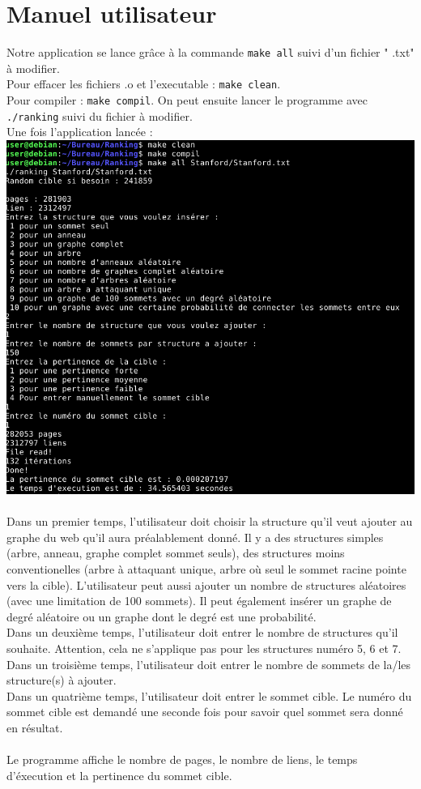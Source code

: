 \documentclass[a4paper,11pt]{article}
\begin{document}
\section{Manuel utilisateur}
	Notre application se lance grâce à la commande \texttt{make all} suivi d'un fichier " .txt" à modifier.\\
	Pour effacer les fichiers .o et l'executable : \texttt{make clean}.\\
	Pour compiler : \texttt{make compil}. On peut ensuite lancer le programme avec \texttt{./ranking} suivi du fichier à modifier.\\
	Une fois l'application lancée :\\
	\includegraphics[scale = 0.5]{Captures/manuel.png}\\
	\\
	Dans un premier temps, l'utilisateur doit choisir la structure qu'il veut ajouter au graphe du web qu'il aura préalablement donné.
	Il y a des structures simples (arbre, anneau, graphe complet sommet seuls), des structures moins conventionelles (arbre à attaquant unique, arbre où seul le sommet racine pointe vers la cible). L'utilisateur peut aussi ajouter un nombre de structures aléatoires (avec une limitation de 100 sommets). Il peut également insérer un graphe de degré aléatoire ou un graphe dont le degré est une probabilité.\\
	Dans un deuxième temps,  l'utilisateur doit entrer le nombre de structures qu'il souhaite. Attention, cela ne s'applique pas pour les structures numéro 5, 6 et 7.\\
	Dans un troisième temps, l'utilisateur doit entrer le nombre de sommets de la/les structure(s) à ajouter.\\
	Dans un quatrième temps, l'utilisateur doit entrer le sommet cible. Le numéro du sommet cible est demandé une seconde fois pour savoir quel sommet sera donné en résultat.\\
	\\
	Le programme affiche le nombre de pages, le nombre de liens, le temps d'éxecution et la pertinence du sommet cible.
	
\end{document}

